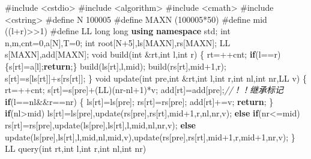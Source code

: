 \documentclass[
]{article}
\newenvironment{Shaded}{}{}
\newcommand{\CommentTok}[1]{\textcolor[rgb]{0.38,0.63,0.69}{\textit{#1}}}
\newcommand{\ControlFlowTok}[1]{\textcolor[rgb]{0.00,0.44,0.13}{\textbf{#1}}}
\newcommand{\DataTypeTok}[1]{\textcolor[rgb]{0.56,0.13,0.00}{#1}}
\newcommand{\DecValTok}[1]{\textcolor[rgb]{0.25,0.63,0.44}{#1}}
\newcommand{\ImportTok}[1]{#1}
\newcommand{\KeywordTok}[1]{\textcolor[rgb]{0.00,0.44,0.13}{\textbf{#1}}}
\newcommand{\NormalTok}[1]{#1}
\newcommand{\PreprocessorTok}[1]{\textcolor[rgb]{0.74,0.48,0.00}{#1}}
\begin{document}
\begin{Shaded}
\begin{Highlighting}[]
\PreprocessorTok{\#include }\ImportTok{\textless{}cstdio\textgreater{}}
\PreprocessorTok{\#include }\ImportTok{\textless{}algorithm\textgreater{}}
\PreprocessorTok{\#include }\ImportTok{\textless{}cmath\textgreater{}}
\PreprocessorTok{\#include }\ImportTok{\textless{}cstring\textgreater{}}
\PreprocessorTok{\#define N }\DecValTok{100005}
\PreprocessorTok{\#define MAXN }\NormalTok{(}\DecValTok{100005}\NormalTok{*}\DecValTok{50}\NormalTok{)}
\PreprocessorTok{\#define mid }\NormalTok{((l+r)\textgreater{}\textgreater{}}\DecValTok{1}\NormalTok{)}
\PreprocessorTok{\#define LL }\DataTypeTok{long}\PreprocessorTok{ }\DataTypeTok{long}
\KeywordTok{using} \KeywordTok{namespace}\NormalTok{ std;}
\DataTypeTok{int}\NormalTok{ n,m,cnt=}\DecValTok{0}\NormalTok{,a[N],T=}\DecValTok{0}\NormalTok{;}
\DataTypeTok{int}\NormalTok{ root[N+}\DecValTok{5}\NormalTok{],ls[MAXN],rs[MAXN];}
\NormalTok{LL s[MAXN],add[MAXN];}
\DataTypeTok{void}\NormalTok{ build(}\DataTypeTok{int}\NormalTok{ \&rt,}\DataTypeTok{int}\NormalTok{ l,}\DataTypeTok{int}\NormalTok{ r)}
\NormalTok{\{}
\NormalTok{    rt=++cnt;}
    \ControlFlowTok{if}\NormalTok{(l==r)\{s[rt]=a[l];}\ControlFlowTok{return}\NormalTok{;\}}
\NormalTok{    build(ls[rt],l,mid);}
\NormalTok{    build(rs[rt],mid+}\DecValTok{1}\NormalTok{,r);}
\NormalTok{    s[rt]=s[ls[rt]]+s[rs[rt]];}
\NormalTok{\}}
\DataTypeTok{void}\NormalTok{ update(}\DataTypeTok{int}\NormalTok{ pre,}\DataTypeTok{int}\NormalTok{ \&rt,}\DataTypeTok{int}\NormalTok{ l,}\DataTypeTok{int}\NormalTok{ r,}\DataTypeTok{int}\NormalTok{ nl,}\DataTypeTok{int}\NormalTok{ nr,LL v)}
\NormalTok{\{}
\NormalTok{    rt=++cnt;}
\NormalTok{    s[rt]=s[pre]+(LL)(nr{-}nl+}\DecValTok{1}\NormalTok{)*v;}
\NormalTok{    add[rt]=add[pre];}\CommentTok{//！！继承标记}
    \ControlFlowTok{if}\NormalTok{(l==nl\&\&r==nr)}
\NormalTok{    \{}
\NormalTok{        ls[rt]=ls[pre];}
\NormalTok{        rs[rt]=rs[pre];}
\NormalTok{        add[rt]+=v;}
        \ControlFlowTok{return}\NormalTok{;}
\NormalTok{    \}}
    \ControlFlowTok{if}\NormalTok{(nl\textgreater{}mid) ls[rt]=ls[pre],update(rs[pre],rs[rt],mid+}\DecValTok{1}\NormalTok{,r,nl,nr,v);}
    \ControlFlowTok{else} \ControlFlowTok{if}\NormalTok{(nr\textless{}=mid) rs[rt]=rs[pre],update(ls[pre],ls[rt],l,mid,nl,nr,v);}
    \ControlFlowTok{else}\NormalTok{ update(ls[pre],ls[rt],l,mid,nl,mid,v),update(rs[pre],rs[rt],mid+}\DecValTok{1}\NormalTok{,r,mid+}\DecValTok{1}\NormalTok{,nr,v);}
\NormalTok{\}}
\NormalTok{LL query(}\DataTypeTok{int}\NormalTok{ rt,}\DataTypeTok{int}\NormalTok{ l,}\DataTypeTok{int}\NormalTok{ r,}\DataTypeTok{int}\NormalTok{ nl,}\DataTypeTok{int}\NormalTok{ nr)}

\end{Highlighting}
\end{Shaded}
\end{document}

